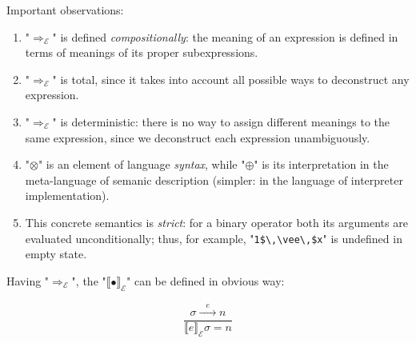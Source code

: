 \documentclass{article}
\def\transarrow{\xrightarrow}
\def\padding{\phantom{X}}
\def\subarrow{}
\newcommand{\trule}[2]{\frac{#1}{#2}}
\newcommand{\trans}[3]{{#1}\transarrow{\padding{\textstyle #2}\padding}\subarrow{#3}}
\newcommand{\sembr}[1]{\llbracket{#1}\rrbracket}
\theoremstyle{definition}
\begin{document}
Important observations:

\begin{enumerate}
  \item "$\Rightarrow_{\mathscr E}$" is defined \emph{compositionally}: the meaning of an expression is defined in terms of meanings
  of its proper subexpressions.
  \item "$\Rightarrow_{\mathscr E}$" is total, since it takes into account all possible ways to deconstruct any expression.
  \item "$\Rightarrow_{\mathscr E}$" is deterministic: there is no way to assign different meanings to the same expression, since
  we deconstruct each expression unambiguously.
  \item "$\otimes$" is an element of language \emph{syntax}, while "$\oplus$" is its interpretation in the meta-language of
  semanic description (simpler: in the language of interpreter implementation).
  \item This concrete semantics is \emph{strict}: for a binary operator both its arguments are evaluated unconditionally; thus,
  for example, "\lstinline|1$\,\vee\,$x|" is undefined in empty state.
\end{enumerate}

Having "$\Rightarrow_{\mathscr E}$", the "$\sembr{\bullet}_{\mathscr E}$" can be defined in obvious way:

\[
\trule{\trans{\sigma}{e}{n}}{\sembr{e}_{\mathscr E}\sigma=n}
\]
\end{document}
